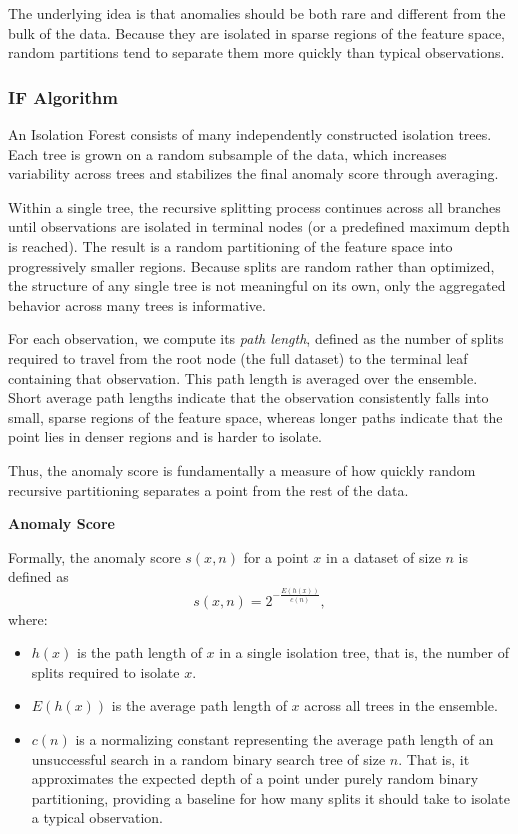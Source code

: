 The underlying idea is that anomalies should be both rare and different from the bulk of the data. Because they are isolated in sparse regions of the feature space, random partitions tend to separate them more quickly than typical observations.

\bigskip

\subsubsection{IF Algorithm}

\medskip

An Isolation Forest consists of many independently constructed isolation trees. 
Each tree is grown on a random subsample of the data, which increases variability across trees and stabilizes the final anomaly score through averaging.

Within a single tree, the recursive splitting process continues across all branches until observations are isolated in terminal nodes (or a predefined maximum depth is reached). 
The result is a random partitioning of the feature space into progressively smaller regions. 
Because splits are random rather than optimized, the structure of any single tree is not meaningful on its own, only the aggregated behavior across many trees is informative.

For each observation, we compute its \textit{path length}, defined as the number of splits required to travel from the root node (the full dataset) to the terminal leaf containing that observation. This path length is averaged over the ensemble. Short average path lengths indicate that the observation consistently falls into small, sparse regions of the feature space, whereas longer paths indicate that the point lies in denser regions and is harder to isolate.

Thus, the anomaly score is fundamentally a measure of how quickly random recursive partitioning separates a point from the rest of the data.


\medskip

\textbf{Anomaly Score}

Formally, the anomaly score $s(x,n)$ for a point $x$ in a dataset of size $n$ is defined as
\[
s(x,n) = 2^{-\frac{E(h(x))}{c(n)}},
\]
where:

\begin{itemize}
    \item $h(x)$ is the path length of $x$ in a single isolation tree, that is, the number of splits required to isolate $x$.
    \item $E(h(x))$ is the average path length of $x$ across all trees in the ensemble.
    \item $c(n)$ is a normalizing constant representing the average path length of an unsuccessful search in a random binary search tree of size $n$. 
    That is, it approximates the expected depth of a point under purely random binary partitioning, providing a baseline for how many splits it should take to isolate a typical observation.

\end{itemize}

